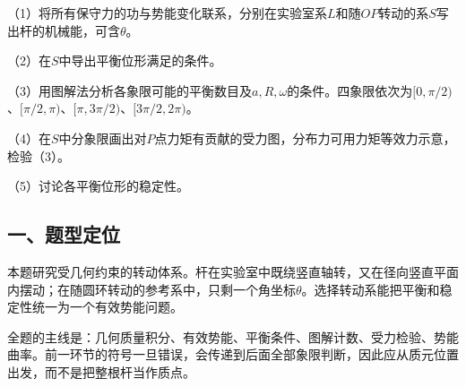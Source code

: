 \documentclass[12pt,a4paper,fontset=fandol]{ctexart}
\begin{document}
\begin{center}
\begin{minipage}{\linewidth}
\centering\begingroup{}
\ifdim\wd\diagrambox>.88\linewidth
\sbox{\diagrambox}{\resizebox{.88\linewidth}{!}{\usebox{\diagrambox}}}\fi
\ifdim\ht\diagrambox>.38\textheight
\resizebox{!}{.38\textheight}{\usebox{\diagrambox}}
\else\usebox{\diagrambox}\fi
\par{}\endgroup\end{minipage}\end{center}

（1）将所有保守力的功与势能变化联系，分别在实验室系\(L\)和随\(OP\)转动的系\(S\)写出杆的机械能，可含\(\theta\)。

（2）在\(S\)中导出平衡位形满足的条件。

（3）用图解法分析各象限可能的平衡数目及\(a,R,\omega\)的条件。四象限依次为\([0,\pi/2)\)、\([\pi/2,\pi)\)、\([\pi,3\pi/2)\)、\([3\pi/2,2\pi)\)。

（4）在\(S\)中分象限画出对\(P\)点力矩有贡献的受力图，分布力可用力矩等效力示意，检验（3）。

（5）讨论各平衡位形的稳定性。

\subsection{一、题型定位}\label{ux4e00ux9898ux578bux5b9aux4f4d-3}

本题研究受几何约束的转动体系。杆在实验室中既绕竖直轴转，又在径向竖直平面内摆动；在随圆环转动的参考系中，只剩一个角坐标\(\theta\)。选择转动系能把平衡和稳定性统一为一个有效势能问题。

全题的主线是：几何质量积分、有效势能、平衡条件、图解计数、受力检验、势能曲率。前一环节的符号一旦错误，会传递到后面全部象限判断，因此应从质元位置出发，而不是把整根杆当作质点。
\end{document}
